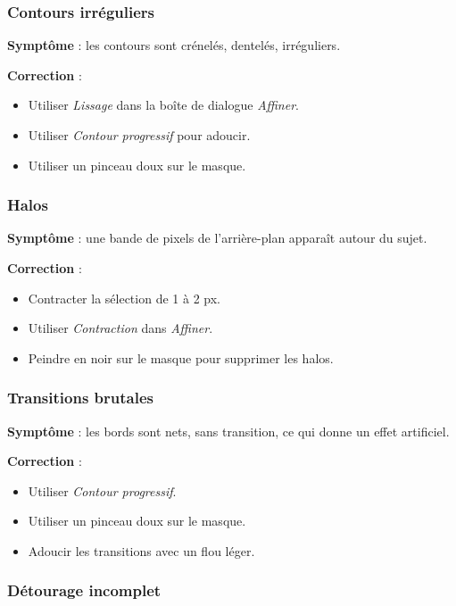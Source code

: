 \subsubsection{Contours irréguliers}

\textbf{Symptôme} : les contours sont crénelés, dentelés, irréguliers.

\textbf{Correction} :
\begin{itemize}
    \item Utiliser \emph{Lissage} dans la boîte de dialogue \emph{Affiner}.
    \item Utiliser \emph{Contour progressif} pour adoucir.
    \item Utiliser un pinceau doux sur le masque.
\end{itemize}

\subsubsection{Halos}

\textbf{Symptôme} : une bande de pixels de l'arrière-plan apparaît autour du sujet.

\textbf{Correction} :
\begin{itemize}
    \item Contracter la sélection de 1 à 2 px.
    \item Utiliser \emph{Contraction} dans \emph{Affiner}.
    \item Peindre en noir sur le masque pour supprimer les halos.
\end{itemize}

\subsubsection{Transitions brutales}

\textbf{Symptôme} : les bords sont nets, sans transition, ce qui donne un effet artificiel.

\textbf{Correction} :
\begin{itemize}
    \item Utiliser \emph{Contour progressif}.
    \item Utiliser un pinceau doux sur le masque.
    \item Adoucir les transitions avec un flou léger.
\end{itemize}

\subsubsection{Détourage incomplet}

